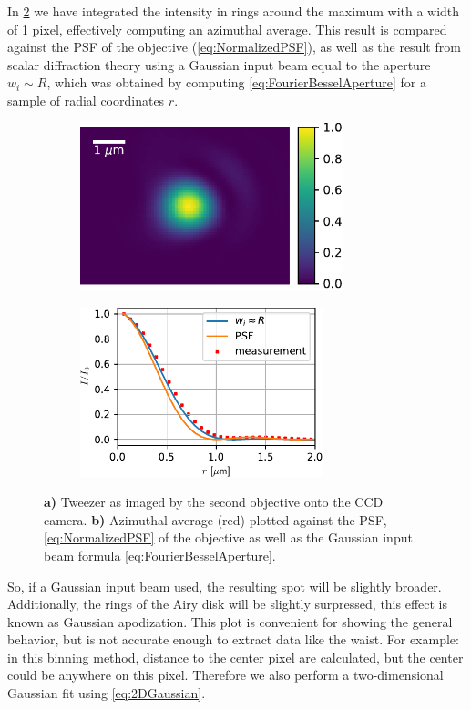 In \cref{fig:AzimuthalAverage} we have integrated the intensity in rings around the maximum with a width of 1 pixel, effectively computing an azimuthal average. 
This result is compared against the \ac{PSF} of the objective (\cref{eq:NormalizedPSF}), as well as the result from scalar diffraction theory using a Gaussian input beam equal to the aperture $w_i \sim R$, which was obtained by computing \cref{eq:FourierBesselAperture} for a sample of radial coordinates $r$. 
\begin{figure}
\centering
    \centering
	\begin{subfigure}{.49\textwidth}
		\includegraphics[height=4.9cm]{figures/SingleSpotZoomed.pdf}
		\caption{}
		\label{fig:SingleSpotZoomed}
	\end{subfigure}
	\begin{subfigure}{.49\textwidth}
		\centering
		\includegraphics[height=4.9cm]{figures/AzimuthalAverage.pdf}
		\caption{}
		\label{fig:AzimuthalAverage}
	\end{subfigure}
	\caption{\textbf{a)} Tweezer as imaged by the second objective onto the CCD camera. 
	\textbf{ b)} Azimuthal average (red) plotted against the \ac{PSF}, \cref{eq:NormalizedPSF} of the objective as well as the Gaussian input beam formula \cref{eq:FourierBesselAperture}.}
	\label{fig:2Dresults}
\end{figure}

So, if a Gaussian input beam used, the resulting spot will be slightly broader.
Additionally, the rings of the Airy disk will be slightly surpressed, this effect is known as Gaussian apodization.
This plot is convenient for showing the general behavior, but is not accurate enough to extract data like the waist. 
For example: in this binning method, distance to the center pixel are calculated, but the center could be anywhere on this pixel. 
Therefore we also perform a two-dimensional Gaussian fit using \cref{eq:2DGaussian}.

